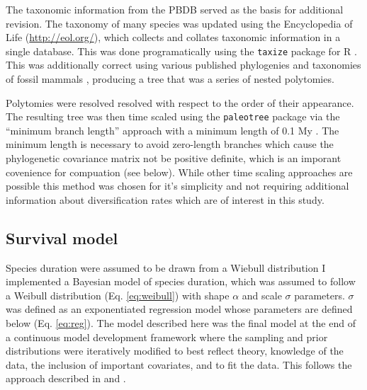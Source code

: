 \documentclass[12pt,letterpaper]{article}
\begin{document}
The taxonomic information from the PBDB served as the basis for additional revision. The taxonomy of many species was updated using the Encyclopedia of Life (\url{http://eol.org/}), which collects and collates taxonomic information in a single database. This was done programatically using the \texttt{taxize} package for R \citep{2013taxize}. This was additionally correct using various published phylogenies and taxonomies of fossil mammals \citep{Raia2012f,Janis1998,Janis2008}, producing a tree that was a series of nested polytomies. 

Polytomies were resolved resolved with respect to the order of their appearance. The resulting tree was then time scaled using the \texttt{paleotree} package via the ``minimum branch length'' approach with a minimum length of 0.1 My \citep{Bapst2012a}. The minimum length is necessary to avoid zero-length branches which cause the phylogenetic covariance matrix not be positive definite, which is an imporant covenience for compuation (see below). While other time scaling approaches are possible \citep{Bapst2013a,Hedman2010} this method was chosen for it's simplicity and not requiring additional information about diversification rates which are of interest in this study. 



\subsection{Survival model}

Species duration were assumed to be drawn from a Wiebull distribution
I implemented a Bayesian model of species duration, which was assumed to follow a Weibull distribution (Eq. \ref{eq:weibull}) with shape \(\alpha\) and scale \(\sigma\) parameters. \(\sigma\) was defined as an exponentiated regression model whose parameters are defined below (Eq. \ref{eq:reg}). The model described here was the final model at the end of a continuous model development framework where the sampling and prior distributions were iteratively modified to best reflect theory, knowledge of the data, the inclusion of important covariates, and to fit the data. This follows the approach described in \citet{Gelman2007} and \citet{Gelman2013d}.
\end{document}
